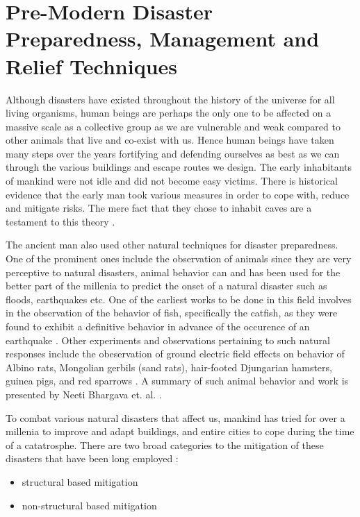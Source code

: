 \section{Pre-Modern Disaster Preparedness, Management and Relief Techniques}
\label{sec:pastwork:Pre-Modern Disaster Preparedness, Management and Relief Techniques}

Although disasters have existed throughout the history of the universe for all living organisms, human beings are perhaps the only one to be affected on a massive scale as a collective group as we are vulnerable and weak compared to other animals that live and co-exist with us. Hence human beings have taken many steps over the years fortifying and defending ourselves as best as we can through the various buildings and escape routes we design. The early inhabitants of mankind were not idle and did not become easy victims. There is historical evidence that the early man took various measures in order to cope with, reduce and mitigate risks. The mere fact that they chose to inhabit caves are a testament to this theory \cite{ref6}.

The ancient man also used other natural techniques for disaster preparedness. One of the prominent ones include the observation of animals since they are very perceptive to natural disasters, animal behavior can and has been used for the better part of the millenia to predict the onset of a natural disaster such as floods, earthquakes etc. One of the earliest works to be done in this field involves in the observation of the behavior of fish, specifically the catfish, as they were found to exhibit a definitive behavior in advance of the occurence of an earthquake \cite{ref7}. Other experiments and observations pertaining to such natural responses include the obeservation of ground electric field effects on behavior of Albino rats, Mongolian gerbils (sand rats), hair-footed Djungarian hamsters, guinea pigs, and red sparrows \cite{ref8}. A summary of such animal behavior and work is presented by Neeti Bhargava et. al. \cite{ref9}.

To combat various natural disasters that affect us, mankind has tried for over a millenia to improve and adapt buildings, and entire cities to cope during the time of a catatrosphe. There are two broad categories to the mitigation of these disasters that have been long employed \cite{ref10}:

\begin{itemize}
  \item structural based mitigation
  \item non-structural based mitigation
\end{itemize} 


